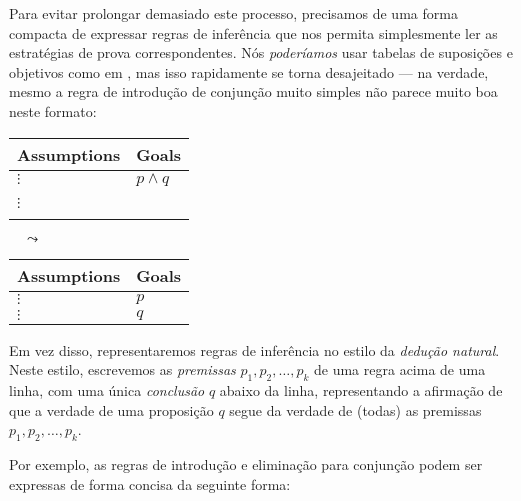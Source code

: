 \begin{itemizar}
\begin{strategy}
Para evitar prolongar demasiado este processo, precisamos de uma forma compacta de expressar regras de inferência que nos permita simplesmente ler as estratégias de prova correspondentes. Nós \textit{poderíamos} usar tabelas de suposições e objetivos como em , mas isso rapidamente se torna desajeitado --- na verdade, mesmo a regra de introdução de conjunção muito simples \introrule{\wedge} não parece muito boa neste formato:
\begin{center}
\begin{tabular}{C{60pt}|C{60pt}}
{\small \textbf{Assumptions}} & {\small \textbf{Goals}} \\ \hline
$\vdots$ & $p \wedge q$ \\
$\vdots$ & ~
\end{tabular}
$\quad \leadsto \quad$
\begin{tabular}{C{60pt}|C{60pt}}
{\small \textbf{Assumptions}} & \small{\textbf{Goals}} \\ \hline
$\vdots$ & $p$ \\
$\vdots$ & $q$
\end{tabular}
\end{center}

Em vez disso, representaremos regras de inferência no estilo da \textit{dedução natural}. Neste estilo, escrevemos as \textit{premissas} $p_1,p_2,\dots,p_k$ de uma regra acima de uma linha, com uma única \textit{conclusão} $q$ abaixo da linha, representando a afirmação de que a verdade de uma proposição $q$ segue da verdade de (todas) as premissas $p_1,p_2,\dots,p_k$.

\begin{center}
\begin{prooftree}
\end{prooftree}
\end{center}

Por exemplo, as regras de introdução e eliminação para conjunção podem ser expressas de forma concisa da seguinte forma:


\end{strategy}
\end{itemizar}
